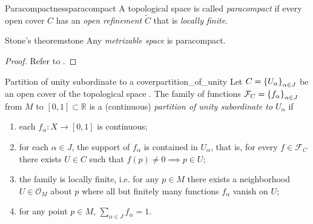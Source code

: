 \begin{definition}{Paracompactness}{paracompact}
    A topological space  is called \emph{paracompact} if every open cover \(C\) has an \emph{open refinement} \(\tilde{C}\) that is \emph{locally finite}.
\end{definition}

\begin{theorem}{Stone's theorem}{stone}
    Any \emph{metrizable space} is paracompact.
\end{theorem}
\begin{proof}
    Refer to \cite{munkres_topology}.
\end{proof}

\begin{definition}{Partition of unity subordinate to a cover}{partition_of_unity}
    Let \(C = \left\{U_\alpha\right\}_{\alpha \in J}\) be an open cover of the topological space . The family of functions \(\mathcal{F}_C = \left\{f_\alpha\right\}_{\alpha \in J}\) from \(M\) to \([0, 1]\subset \mathbb{R}\) is a (continuous) \emph{partition of unity subordinate to \(U_\alpha\)} if
    \begin{enumerate}[label=(\alph*)]
        \item each \(f_\alpha : X \to [0,1]\) is continuous;
        \item for each \(\alpha \in J\), the support of \(f_\alpha\) is contained in \(U_\alpha\), that is, for every \(f \in \mathcal{F}_C\) there exists \(U \in C\) such that \(f(p) \neq 0 \implies p \in U\);
        \item the family  is locally finite, i.e. for any \(p \in M\) there exists a neighborhood \(U \in \mathcal{O}_M\) about \(p\) where all but finitely many functions \(f_\alpha\) vanish on \(U\);
        \item for any point \(p \in M\), \(\sum_{\alpha \in J} f_\alpha = 1\).
    \end{enumerate}
\end{definition}

